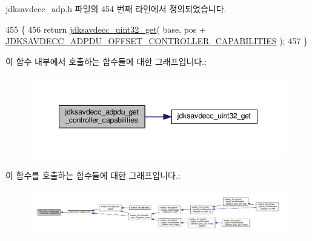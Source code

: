 jdksavdecc\+\_\+adp.\+h 파일의 454 번째 라인에서 정의되었습니다.


\begin{DoxyCode}
455 \{
456     \textcolor{keywordflow}{return} \hyperlink{group__endian_gaefcf5bd4f368997a82f358ab89052d6b}{jdksavdecc\_uint32\_get}( base, pos + 
      \hyperlink{group__adpdu_ga3e47949e00143c3125bc88b85737656f}{JDKSAVDECC\_ADPDU\_OFFSET\_CONTROLLER\_CAPABILITIES} );
457 \}
\end{DoxyCode}


이 함수 내부에서 호출하는 함수들에 대한 그래프입니다.\+:
\nopagebreak
\begin{figure}[H]
\begin{center}
\leavevmode
\includegraphics[width=348pt]{group__adpdu_ga6c8b9d1301ebb8e43869704497af73bc_cgraph}
\end{center}
\end{figure}




이 함수를 호출하는 함수들에 대한 그래프입니다.\+:
\nopagebreak
\begin{figure}[H]
\begin{center}
\leavevmode
\includegraphics[width=350pt]{group__adpdu_ga6c8b9d1301ebb8e43869704497af73bc_icgraph}
\end{center}
\end{figure}


